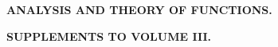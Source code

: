 \clearpage
{}

\vspace*{4cm}
\begin{center}
\textbf{\Large ANALYSIS AND THEORY OF FUNCTIONS.}

\vspace{1em}
\textbf{SUPPLEMENTS TO VOLUME III.}
\end{center}
\clearpage
